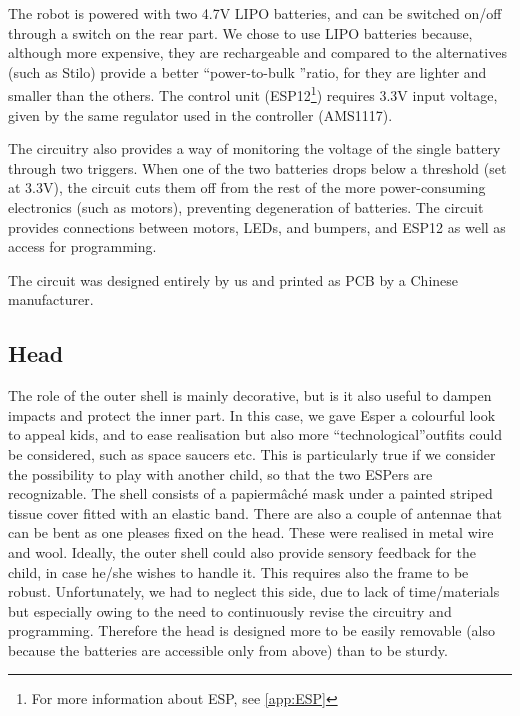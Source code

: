 \documentclass[a4paper,twoside]{book}
\begin{document}
The robot is powered with two 4.7V LIPO batteries, and can be switched on/off through a switch on the rear part. We chose to use LIPO batteries because, although more expensive, they are rechargeable and \textemdash compared to the alternatives (such as Stilo) \textemdash provide a better \textquotedblleft power-to-bulk \textquotedblright ratio, for they are lighter and smaller than the others.
The control unit (ESP12\footnote{For more information about ESP, see \autoref{app:ESP}}) requires 3.3V input voltage, given by the same regulator used in the controller (AMS1117).

The circuitry also provides a way of monitoring the voltage of the single battery through two triggers. When one of the two batteries drops below a threshold (set at 3.3V), the circuit cuts them off from the rest of the more power-consuming electronics (such as motors), preventing degeneration of batteries. The circuit provides connections between motors, LEDs, and bumpers, and ESP12 as well as access for programming.

The circuit was designed entirely by us and printed as PCB by a Chinese manufacturer.

\subsection{Head}

The role of the outer shell is mainly decorative, but is it also useful to dampen impacts and protect the inner part. In this case, we gave Esper a colourful look to appeal kids, and to ease realisation but also more \textquotedblleft technological\textquotedblright outfits could be considered, such as space saucers etc. This is particularly true if we consider the possibility to play with another child, so that the two ESPers are recognizable.
The shell consists of a papier\textendash m\^{a}ch\'{e} mask under a painted striped tissue cover fitted with an elastic band. There are also a couple of antennae that can be bent as one pleases fixed on the head. These were realised in metal wire and wool.
Ideally, the outer shell could also provide sensory feedback for the child, in case he/she wishes to handle it.
This requires also the frame to be robust. Unfortunately, we had to neglect this side, due to lack of time/materials but especially owing to the need to continuously revise the circuitry and programming. Therefore the head is designed more to be easily removable (also because the batteries are accessible only from above) than to be sturdy.
\end{document}
